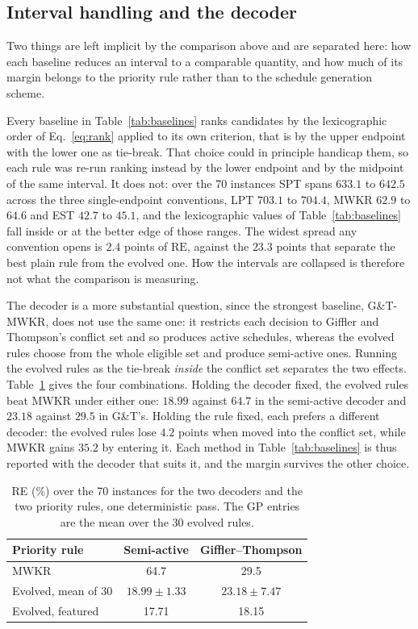 \documentclass[review,authoryear,11pt]{elsarticle}
\newcommand{\rev}[1]{\textcolor{revcolor}{#1}}
\newcommand{\RE}{\mathrm{RE}}
\begin{document}
\subsection{Interval handling and the decoder}
\label{sec:decoder}

\rev{Two things are left implicit by the comparison above and are
separated here: how each baseline reduces an interval to a comparable
quantity, and how much of its margin belongs to the priority rule rather
than to the schedule generation scheme.}

\rev{Every baseline in Table~\ref{tab:baselines} ranks candidates by the
lexicographic order of Eq.~\eqref{eq:rank} applied to its own criterion,
that is by the upper endpoint with the lower one as tie-break. That
choice could in principle handicap them, so each rule was re-run
ranking instead by the lower endpoint and by the midpoint of the same
interval. It does not: over the 70 instances SPT spans $633.1$ to
$642.5$ across the three single-endpoint conventions, LPT $703.1$ to
$704.4$, MWKR $62.9$ to $64.6$ and EST $42.7$ to $45.1$, and the
lexicographic values of Table~\ref{tab:baselines} fall inside or at the
better edge of those ranges. The widest spread any convention opens is
$2.4$ points of $\RE$, against the $23.3$ points that separate the best
plain rule from the evolved one. How the intervals are collapsed is
therefore not what the comparison is measuring.}

\rev{The decoder is a more substantial question, since the strongest
baseline, G\&T-MWKR, does not use the same one: it restricts each
decision to Giffler and Thompson's conflict set and so produces active
schedules, whereas the evolved rules choose from the whole eligible set
and produce semi-active ones. Running the evolved rules as the
tie-break \emph{inside} the conflict set separates the two effects.
Table~\ref{tab:decoder} gives the four combinations. Holding the
decoder fixed, the evolved rules beat MWKR under either one: $18.99$
against $64.7$ in the semi-active decoder and $23.18$ against $29.5$
in G\&T's. Holding the rule fixed, each prefers a different decoder:
the evolved rules lose $4.2$ points when moved into the conflict set,
while MWKR gains $35.2$ by entering it. Each method in
Table~\ref{tab:baselines} is thus reported with the decoder that suits
it, and the margin survives the other choice.}

\begin{table}[t]
\centering\small
\color{revcolor}
\caption{\rev{RE (\%) over the 70 instances for the two decoders and the
two priority rules, one deterministic pass. The GP entries are the mean
over the 30 evolved rules.}}
\label{tab:decoder}
\begin{tabular}{lcc}
\toprule
Priority rule & Semi-active & Giffler--Thompson \\
\midrule
MWKR & 64.7 & 29.5 \\
Evolved, mean of 30 & $\mathbf{18.99} \pm 1.33$ & $23.18 \pm 7.47$ \\
Evolved, featured & 17.71 & 18.15 \\
\bottomrule
\end{tabular}
\end{table}
\end{document}
